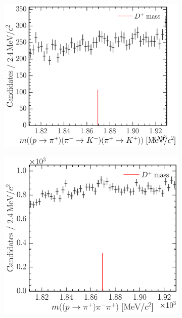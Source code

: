\begin{figure}
\begin{subfigure}[b]{0.3\textwidth}
    \caption{\decay{\PDplus}{\Ppiplus\PKminus\Ppiplus}}
    \label{fig:cpv:selection:background_study:ppipi_meson:pikpi}
  \end{subfigure}
  \begin{subfigure}[b]{0.3\textwidth}
    \includegraphics[width=\textwidth]{figures/cpv/selection/background_study/ppipi/LcToppipi_2012_MagDown_Dp_ppTopip_pimTokm_pipTokp}
    \caption{\decay{\PDplus}{\Ppiplus\PKminus\PKplus}}
    \label{fig:cpv:selection:background_study:ppipi_meson:pikk}
  \end{subfigure}
  \begin{subfigure}[b]{0.3\textwidth}
    \includegraphics[width=\textwidth]{figures/cpv/selection/background_study/ppipi/LcToppipi_2012_MagDown_Dp_ppTopip_pim_pip}

\end{subfigure}
\end{figure}
